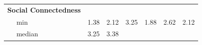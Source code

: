 \documentclass[
  english,
  man,floatsintext]{apa6}
\begin{document}
\begin{longtable}[]{@{}lllllll@{}}
\begin{minipage}[t]{0.16\columnwidth}
\textbf{Social Connectedness}\strut
\end{minipage} & \begin{minipage}[t]{0.11\columnwidth}\raggedright
~~\strut
\end{minipage} & \begin{minipage}[t]{0.11\columnwidth}\raggedright
~~\strut
\end{minipage} & \begin{minipage}[t]{0.11\columnwidth}\raggedright
~~\strut
\end{minipage} & \begin{minipage}[t]{0.11\columnwidth}\raggedright
~~\strut
\end{minipage} & \begin{minipage}[t]{0.11\columnwidth}\raggedright
~~\strut
\end{minipage} & \begin{minipage}[t]{0.11\columnwidth}\raggedright
~~\strut
\end{minipage}\tabularnewline
\begin{minipage}[t]{0.16\columnwidth}\raggedright
~~ min\strut
\end{minipage} & \begin{minipage}[t]{0.11\columnwidth}\raggedright
1.38\strut
\end{minipage} & \begin{minipage}[t]{0.11\columnwidth}\raggedright
2.12\strut
\end{minipage} & \begin{minipage}[t]{0.11\columnwidth}\raggedright
3.25\strut
\end{minipage} & \begin{minipage}[t]{0.11\columnwidth}\raggedright
1.88\strut
\end{minipage} & \begin{minipage}[t]{0.11\columnwidth}\raggedright
2.62\strut
\end{minipage} & \begin{minipage}[t]{0.11\columnwidth}\raggedright
2.12\strut
\end{minipage}\tabularnewline
\begin{minipage}[t]{0.16\columnwidth}\raggedright
~~ median\strut
\end{minipage} & \begin{minipage}[t]{0.11\columnwidth}\raggedright
3.25\strut
\end{minipage} & \begin{minipage}[t]{0.11\columnwidth}\raggedright
3.38\strut
\end{minipage} & \begin{minipage}[t]{0.11\columnwidth}\raggedright

\end{minipage}
\end{longtable}
\end{document}
